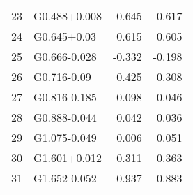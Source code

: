\begin{tabular}{rlrr}
             23 &   G0.488+0.008 &      0.645 &               0.617 \\
             24 &    G0.645+0.03 &      0.615 &               0.605 \\
             25 &   G0.666-0.028 &     -0.332 &              -0.198 \\
             26 &    G0.716-0.09 &      0.425 &               0.308 \\
             27 &   G0.816-0.185 &      0.098 &               0.046 \\
             28 &   G0.888-0.044 &      0.042 &               0.036 \\
             29 &   G1.075-0.049 &      0.006 &               0.051 \\
             30 &   G1.601+0.012 &      0.311 &               0.363 \\
             31 &   G1.652-0.052 &      0.937 &               0.883 \\
\bottomrule
\end{tabular}
